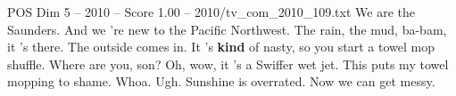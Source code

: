 \begin{textsample}{POS Dim 5 – 2010 – Score 1.00 – 2010/tv\_com\_2010\_109.txt}  \label{ex:f5_pos_077}
We are the Saunders.
And we 're new to the Pacific Northwest.
The rain, the mud, ba-bam, it 's there.
The outside comes in.
It 's \textbf{kind} of nasty, so you start a towel mop shuffle.
Where are you, son?
Oh, wow, it 's a Swiffer wet jet.
This puts my towel mopping to shame.
Whoa.
Ugh.
Sunshine is overrated.
Now we can get messy.

\end{textsample}

